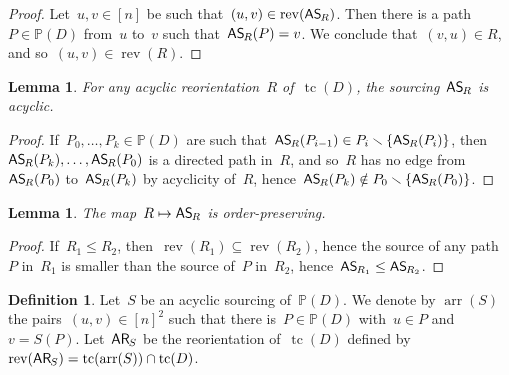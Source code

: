 \documentclass{amsart}
\newtheorem{lemma}[theorem]{Lemma}
\theoremstyle{definition}
\newtheorem{definition}[theorem]{Definition}
\newcommand{\ssm}{\smallsetminus} %
\DeclareMathOperator{\tc}{tc} %
\newcommand{\mymap}[2]{\mathsf{#1}_{\hspace{-.7pt}#2}}
\newcommand{\areori}[1]{\mymap{AR}{#1}}  %
\DeclareMathOperator{\rev}{rev} %
\newcommand{\asour}[1]{\mymap{AS}{#1}}  %
\DeclareMathOperator{\arr}{arr} %
\newcommand{\PP}{\mathbb P} %
\begin{document}
\begin{proof}
Let~$u,v \in [n]$ be such that~$(u,v) \in \rev(\asour{R})$. 
Then there is a path~$P \in \PP(D)$ from~$u$ to~$v$ such that~$\asour{R}(P) = v$.
We conclude that~$(v,u) \in R$, and so~$(u,v) \in \rev(R)$.
\end{proof}

\begin{lemma}
\label{lem:AReori2ASour2}
For any acyclic reorientation~$R$ of~$\tc(D)$, the sourcing~$\asour{R}$ is acyclic.
\end{lemma}

\begin{proof}
If~$P_0, \dots, P_k \in \PP(D)$ are such that~$\asour{R}(P_{i-1}) \in P_i \ssm \{\asour{R}(P_i)\}$, then~$\asour{R}(P_k), \dots, \asour{R}(P_0)$ is a directed path in~$R$, and so~$R$ has no edge from~$\asour{R}(P_0)$ to~$\asour{R}(P_k)$ by acyclicity of~$R$, hence~${\asour{R}(P_k) \notin P_0 \ssm \{\asour{R}(P_0)\}}$.
\end{proof}

\begin{lemma}
\label{lem:AReori2ASour3}
The map~$R \mapsto \asour{R}$ is order-preserving.
\end{lemma}

\begin{proof}
If~$R_1 \le R_2$, then~$\rev(R_1) \subseteq \rev(R_2)$, hence the source of any path~$P$ in~$R_1$ is smaller than the source of~$P$ in~$R_2$, hence~$\asour{R_1} \le \asour{R_2}$.
\end{proof}

\begin{definition}
\label{def:ASour2AReori}
Let~$S$ be an acyclic sourcing of~$\PP(D)$.
We denote by $\arr(S)$ the pairs~$(u,v) \in [n]^2$ such that there is~$P \in \PP(D)$ with~$u \in P$ and~$v = S(P)$.
Let~$\areori{S}$ be the reorientation of~$\tc(D)$ defined by~$\rev(\areori{S}) = \tc(\arr(S)) \cap \tc(D)$.
\end{definition}
\end{document}
